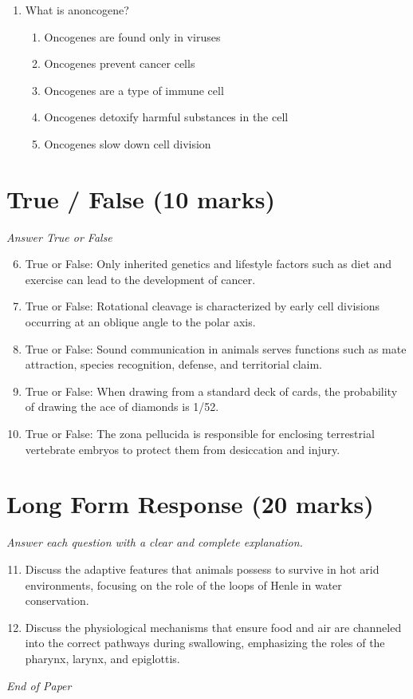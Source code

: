 \documentclass[12pt]{article}
\begin{document}
\begin{enumerate}[label=\arabic*.]
\begin{enumerate}[label=(\alph*)]
    \item parenchyma
    \item phloem
    \item endoderm
    \item pericycle
    \item cortex
\end{enumerate}
\item What is anoncogene?
\begin{enumerate}[label=(\alph*)]
    \item Oncogenes are found only in viruses
    \item Oncogenes prevent cancer cells
    \item Oncogenes are a type of immune cell
    \item Oncogenes detoxify harmful substances in the cell
    \item Oncogenes slow down cell division
\end{enumerate}
\end{enumerate}

\section*{True / False (10 marks)}
\textit{Answer True or False}
\begin{enumerate}[label=\arabic*.]
\setcounter{enumi}{5}
\item True or False: Only inherited genetics and lifestyle factors such as diet and exercise can lead to the development of cancer.
\item True or False: Rotational cleavage is characterized by early cell divisions occurring at an oblique angle to the polar axis.
\item True or False: Sound communication in animals serves functions such as mate attraction, species recognition, defense, and territorial claim.
\item True or False: When drawing from a standard deck of cards, the probability of drawing the ace of diamonds is 1/52.
\item True or False: The zona pellucida is responsible for enclosing terrestrial vertebrate embryos to protect them from desiccation and injury.
\end{enumerate}

\section*{Long Form Response (20 marks)}
\textit{Answer each question with a clear and complete explanation.}
\begin{enumerate}[label=\arabic*.]
\setcounter{enumi}{10}
\item Discuss the adaptive features that animals possess to survive in hot arid environments, focusing on the role of the loops of Henle in water conservation.
\item Discuss the physiological mechanisms that ensure food and air are channeled into the correct pathways during swallowing, emphasizing the roles of the pharynx, larynx, and epiglottis.
\end{enumerate}

\vfill
\noindent\textit{End of Paper}
\end{document}
